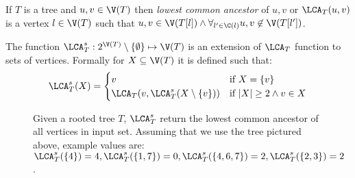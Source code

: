 \begin{defi}
    If $T$ is a tree and $u,v \in \V(T)$ then \emph{lowest common ancestor} of $u, v$ or $\LCA_T(u,v)$ is a vertex $l \in \V(T)$ such that $u,v \in \V(T[l]) \land \forall_{l' \in \C(l)} u,v \not\in \V(T[l'])$.
\end{defi}

\begin{defi}
    The function $\LCA_T^s : 2^{\V(T)} \setminus \{ \emptyset \} \mapsto \V(T)$ is an extension of $\LCA_T$ function to sets of vertices. Formally for $X \subseteq \V(T)$ it is defined such that:
    \[
        \LCA_T^s(X) = \begin{cases}
            v                                      & \text{if } X = \{v\}                \\
            \LCA_T(v, \LCA_T^s(X \setminus \{v\})) & \text{if } |X| \geq 2 \land v \in X \\
        \end{cases}
    \]
\end{defi}

\begin{figure}[h]
    \centering
    \caption{Given a rooted tree $T$, $\LCA_T^s$ return the lowest common ancestor of all vertices in input set. Assuming that we use the tree pictured above, example values are: $\LCA_T^s(\{4\}) = 4, \LCA_T^s(\{1,7\}) = 0, \LCA_T^s(\{4, 6, 7\}) = 2, \LCA_T^s(\{2,3\}) = 2$.}
\end{figure}

